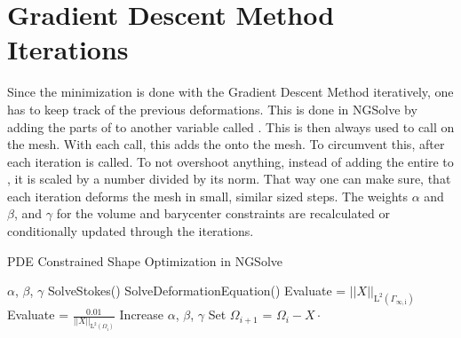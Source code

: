\section{Gradient Descent Method Iterations}

Since the minimization is done with the Gradient Descent Method iteratively, one has to keep track of the previous 
deformations. This is done in NGSolve by adding the parts of  to another 
variable called . This  is then always used to call 
on the mesh. With each call, this adds the  onto the mesh. To circumvent this, 
after each iteration  is called. To not overshoot anything, 
instead of adding the entire  to , it is scaled by a number divided 
by its norm. That way one can make sure, that each iteration deforms the mesh in small, 
similar sized steps.  The weights $\alpha$ and $\beta$, and $\gamma$ for the volume and 
barycenter constraints are recalculated or conditionally updated through the iterations. \\

\begin{algorithm}
	\renewcommand{\thealgorithm}{}
	\caption{PDE Constrained Shape Optimization in NGSolve}
	\begin{algorithmic}[1]
	\State {}
	\State {} $\alpha$, $\beta$, $\gamma$ 
		\State SolveStokes() 
		\State SolveDeformationEquation() 
		\State Evaluate  = $ || X ||_{\mathrm{L}^2(\Gamma_{\infty , \mathrm{i}})} $
		\State Evaluate  = $ \frac{0.01}{|| X ||_{\mathrm{L}^2(\Omega_{\mathrm{i}})}} $
			\State Increase $\alpha$, $\beta$, $\gamma$
			\State {}
		\EndIf
		\EndIf
		\State Set $\Omega_{i+1}$ =  $\Omega_i - X \cdot$  
	\EndFor
	\end{algorithmic}
\end{algorithm}